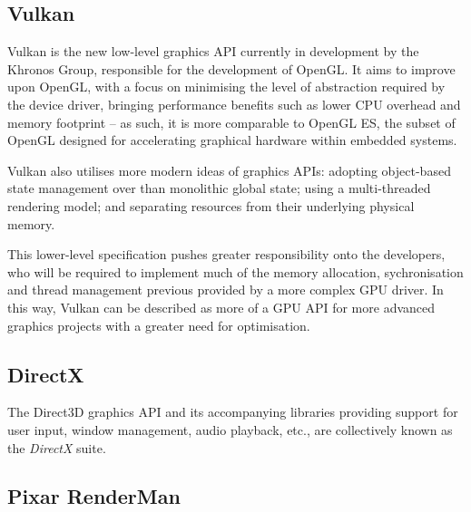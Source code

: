 \documentclass[12pt,twoside]{report}
\begin{document}

\subsection{Vulkan}

Vulkan is the new low-level graphics API currently in development by the Khronos Group, responsible for the development of OpenGL. It aims to improve upon OpenGL, with a focus on minimising the level of abstraction required by the device driver, bringing performance benefits such as lower CPU overhead and memory footprint -- as such, it is more comparable to OpenGL ES, the subset of OpenGL designed for accelerating graphical hardware within embedded systems. \autocite{khronosgroup_vulkan_2023}

Vulkan also utilises more modern ideas of graphics APIs: adopting object-based state management over than monolithic global state; using a multi-threaded rendering model; and separating resources from their underlying physical memory. 

This lower-level specification pushes greater responsibility onto the developers, who will be required to implement much of the memory allocation, sychronisation and thread management previous provided by a more complex GPU driver. In this way, Vulkan can be described as more of a GPU API for more advanced graphics projects with a greater need for optimisation. 



\subsection{DirectX}

The Direct3D graphics API and its accompanying libraries providing support for user input, window management, audio playback, etc., are collectively known as the \textit{DirectX} suite.



\subsection{Pixar RenderMan}
\end{document}
